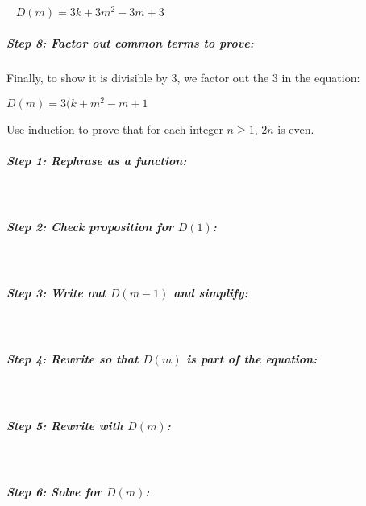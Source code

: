 \documentclass[a4paper,12pt]{book}
\newcounter{question}
\begin{document}
\begin{intro}{\ }
                $D(m) = 3k + 3m^{2} - 3m + 3$

            \subparagraph{Step 8: Factor out common terms to prove:}
                Finally, to show it is divisible by 3, we factor out
                the 3 in the equation:

                $D(m) = 3(k + m^{2} - m + 1$
        \end{intro}

        \newpage
        
        \begin{questionNOGRADE}{\thequestion}
            Use induction to prove that for each integer $n \geq 1$, $2n$ is even.

            \subparagraph{Step 1: Rephrase as a function:} ~\\
            
            \subparagraph{Step 2: Check proposition for $D(1)$:} ~\\

            \subparagraph{Step 3: Write out $D(m-1)$ and simplify:} ~\\

            \subparagraph{Step 4: Rewrite so that $D(m)$ is part of the equation:} ~\\

            \subparagraph{Step 5: Rewrite with $D(m)$:}~\\

            \subparagraph{Step 6: Solve for $D(m)$:}~\\


\end{questionNOGRADE}
\end{document}
